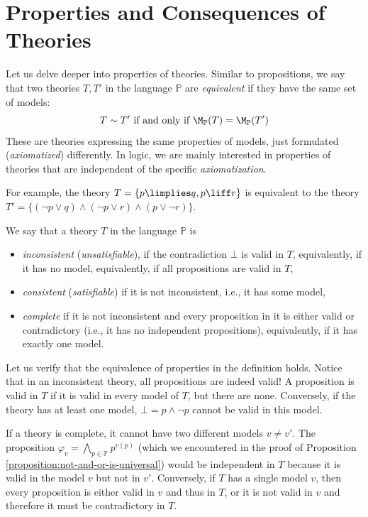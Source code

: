 \section{Properties and Consequences of Theories}

Let us delve deeper into properties of theories. Similar to propositions, we say that two theories $T, T'$ in the language $\mathbb P$ are \emph{equivalent} if they have the same set of models:
$$
T \sim T' \text{ if and only if } \M_\mathbb P(T) = \M_\mathbb P(T')
$$
These are theories expressing the same properties of models, just formulated (\emph{axiomatized}) differently. In logic, we are mainly interested in properties of theories that are independent of the specific \emph{axiomatization}.

\begin{example}
    For example, the theory $T = \{p \limplies q, p \liff r\}$ is equivalent to the theory $T' = \{(\neg p \lor q) \land (\neg p \lor r) \land (p \lor \neg r)\}$.
\end{example}

\begin{definition}
We say that a theory $T$ in the language $\mathbb P$ is
\begin{itemize}
    \item \emph{inconsistent} (\emph{unsatisfiable}), if the contradiction $\bot$ is valid in $T$, equivalently, if it has no model, equivalently, if all propositions are valid in $T$,
    \item \emph{consistent} (\emph{satisfiable}) if it is not inconsistent, i.e., it has some model,
    \item \emph{complete} if it is not inconsistent and every proposition in it is either valid or contradictory (i.e., it has no independent propositions), equivalently, if it has exactly one model.
\end{itemize}    
\end{definition}

Let us verify that the equivalence of properties in the definition holds. Notice that in an inconsistent theory, all propositions are indeed valid! A proposition is valid in $T$ if it is valid in every model of $T$, but there are none. Conversely, if the theory has at least one model, $\bot = p \land \neg p$ cannot be valid in this model.

If a theory is complete, it cannot have two different models $v \neq v'$. The proposition $\varphi_{v} = \bigwedge_{p \in \mathbb P} p^{v(p)}$ (which we encountered in the proof of Proposition \ref{proposition:not-and-or-is-universal}) would be independent in $T$ because it is valid in the model $v$ but not in $v'$. Conversely, if $T$ has a single model $v$, then every proposition is either valid in $v$ and thus in $T$, or it is not valid in $v$ and therefore it must be contradictory in $T$.

